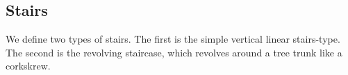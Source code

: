 \subsection{Stairs}
\label{sec:stairs}
  
We define two types of stairs. The first is the simple vertical linear stairs-type. The second is the revolving staircase, which revolves around a tree trunk like a corkskrew. 


%

  
